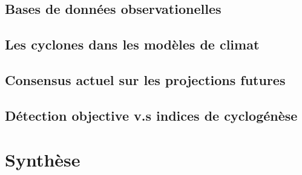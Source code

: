 \documentclass[../main.tex]{subfiles}
\begin{document}
\subsection{Bases de données observationelles}

\subsection{Les cyclones dans les modèles de climat}

\subsection{Consensus actuel sur les projections futures}

\subsection{Détection objective v.s indices de cyclogénèse}

\section{Synthèse}
\end{document}
